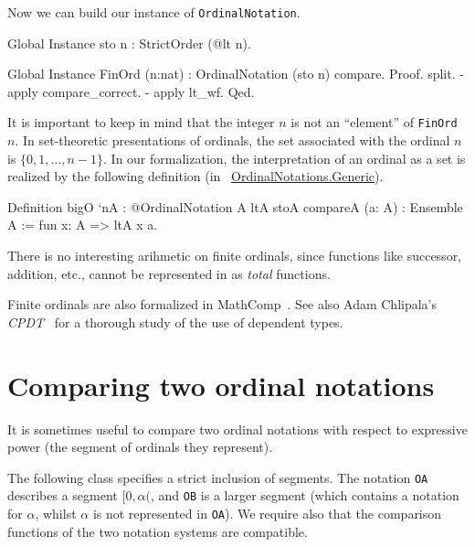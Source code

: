 \documentclass[a4paper]{book}
\begin{document}
Now we can build our instance of \texttt{OrdinalNotation}.

\begin{Coqsrc}
Global Instance sto n : StrictOrder (@lt n).

Global Instance FinOrd (n:nat) : OrdinalNotation (sto n) compare.
Proof.
  split.
  - apply compare_correct.
  - apply lt_wf.
Qed.
\end{Coqsrc}

\begin{remark}
It is important to keep in mind  that the integer $n$ is not an ``element'' of \texttt{FinOrd $n$}. In set-theoretic presentations of ordinals, the set associated with the ordinal $n$ is $\{0,1,\dots,n-1\}$. 
In our formalization, the interpretation of an ordinal as a set is realized by the following definition
(in ~\href{../src/html/hydras.OrdinalNotations.Generic.html}{OrdinalNotations.Generic}).

\begin{Coqsrc}
Definition bigO `{nA : @OrdinalNotation A ltA stoA compareA}
           (a: A) : Ensemble A :=
  fun x: A => ltA x a.
\end{Coqsrc}
\end{remark}


\begin{remark}
 There is no interesting arihmetic on finite ordinals, since functions like successor, addition, etc.,  cannot be represented in \coq{} as \emph{total} functions.
\end{remark}

\begin{remark}
Finite ordinals are also formalized in MathComp~\cite{SSR}.  See also Adam Chlipala's \emph{CPDT}~\cite{chlipalacpdt2011} for a thorough study of the use of dependent types.  
\end{remark}




\section{Comparing two ordinal notations}

It is sometimes useful to compare two ordinal notations with respect to expressive power
(the segment of ordinals  they represent). 

The following class specifies a strict inclusion of segments. The notation \texttt{OA} describes a segment $[0,\alpha($, and \texttt{OB} is a larger segment (which contains a notation for $\alpha$, whilst $\alpha$ is not represented in \texttt{OA}). We require also  that the comparison functions of the two notation systems are compatible.
\end{document}
